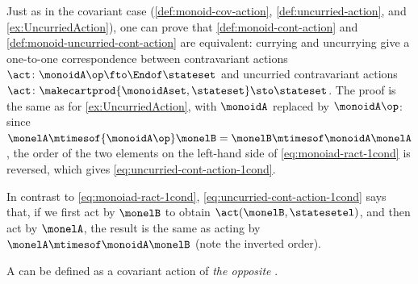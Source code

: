     \begin{remark}
        Just as in the covariant case (\cref{def:monoid-cov-action}, \cref{def:uncurried-action}, and \cref{ex:UncurriedAction}), one can prove that \cref{def:monoid-cont-action} and \cref{def:monoid-uncurried-cont-action} are equivalent: currying and uncurrying give a one-to-one correspondence between contravariant actions $\act \colon \monoidA\op \fto \Endof\stateset$ and uncurried contravariant actions $\act \colon \makecartprod{\monoidAset, \stateset} \sto \stateset$.
        The proof is the same as for \cref{ex:UncurriedAction}, with $\monoidA$ replaced by $\monoidA\op$: since $\monelA \mtimesof{\monoidA\op} \monelB = \monelB \mtimesof\monoidA \monelA$, the order of the two elements on the left-hand side of \cref{eq:monoiad-ract-1cond} is reversed, which gives \cref{eq:uncurried-cont-action-1cond}.
    \end{remark}



    In contrast to \cref{eq:monoiad-ract-1cond}, \cref{eq:uncurried-cont-action-1cond} says that, if we first act by $\monelB$ to obtain $\act(\monelB, \statesetel)$, and then act by $\monelA$, the result is the same as acting by $\monelA \mtimesof\monoidA \monelB$ (note the inverted order).

    A  can be defined as a covariant action of \emph{the opposite} .

   




